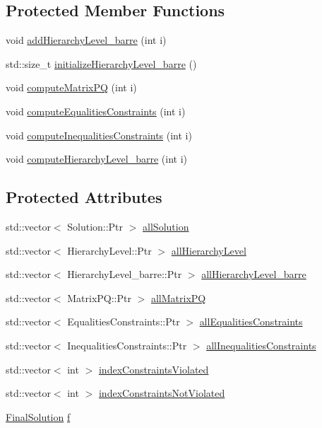 \subsection*{Protected Member Functions}
\begin{DoxyCompactItemize}
\item 
void \hyperlink{classocra_1_1CascadeQP_ae4b95cc384e8fc057f94f05379782642}{add\+Hierarchy\+Level\+\_\+barre} (int i)
\item 
std\+::size\+\_\+t \hyperlink{classocra_1_1CascadeQP_af18be26b3ac162b19f830306b8703813}{initialize\+Hierarchy\+Level\+\_\+barre} ()
\item 
void \hyperlink{classocra_1_1CascadeQP_a7ce909a63e72212c4f3e97ca6c4b92e3}{compute\+Matrix\+PQ} (int i)
\item 
void \hyperlink{classocra_1_1CascadeQP_af402ea4556f12c7dfbbd6124d01543bb}{compute\+Equalities\+Constraints} (int i)
\item 
void \hyperlink{classocra_1_1CascadeQP_af5cf5a79077abf0b043f0d47c021599b}{compute\+Inequalities\+Constraints} (int i)
\item 
void \hyperlink{classocra_1_1CascadeQP_a25feb68d7077bf5a8545313ccfe67edc}{compute\+Hierarchy\+Level\+\_\+barre} (int i)
\end{DoxyCompactItemize}
\subsection*{Protected Attributes}
\begin{DoxyCompactItemize}
\item 
std\+::vector$<$ Solution\+::\+Ptr $>$ \hyperlink{classocra_1_1CascadeQP_ae8883fb4a62f072b2216304955e3e0b2}{all\+Solution}
\item 
std\+::vector$<$ Hierarchy\+Level\+::\+Ptr $>$ \hyperlink{classocra_1_1CascadeQP_add8c599dd93d116ae57c4c5d05cc2bc1}{all\+Hierarchy\+Level}
\item 
std\+::vector$<$ Hierarchy\+Level\+\_\+barre\+::\+Ptr $>$ \hyperlink{classocra_1_1CascadeQP_a83636f53370030bbb53359dae1e40833}{all\+Hierarchy\+Level\+\_\+barre}
\item 
std\+::vector$<$ Matrix\+P\+Q\+::\+Ptr $>$ \hyperlink{classocra_1_1CascadeQP_a9f444092058e2d94da26af59aca9b312}{all\+Matrix\+PQ}
\item 
std\+::vector$<$ Equalities\+Constraints\+::\+Ptr $>$ \hyperlink{classocra_1_1CascadeQP_a53b7452856aa410a83316214d3fe66ad}{all\+Equalities\+Constraints}
\item 
std\+::vector$<$ Inequalities\+Constraints\+::\+Ptr $>$ \hyperlink{classocra_1_1CascadeQP_a45c98a7eaf861a64c86a789ca524d550}{all\+Inequalities\+Constraints}
\item 
std\+::vector$<$ int $>$ \hyperlink{classocra_1_1CascadeQP_a7f6949ea468c0b2536fd97b8e1eb262f}{index\+Constraints\+Violated}
\item 
std\+::vector$<$ int $>$ \hyperlink{classocra_1_1CascadeQP_aff033d8c8c8804f1105d461e0ef7ed12}{index\+Constraints\+Not\+Violated}
\item 
\hyperlink{structocra_1_1FinalSolution}{Final\+Solution} \hyperlink{classocra_1_1CascadeQP_a0363a53bef69ce85777c3a2ce1c4c251}{f}
\end{DoxyCompactItemize}


